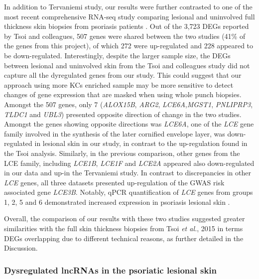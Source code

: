 In addition to Tervaniemi study, our results were further contrasted to one of the most recent comprehensive RNA-seq study comparing lesional and uninvolved full thickness skin biopsies from psoriasis patients \parencite{Tsoi2015}. Out of the 3,723 DEGs reported by Tsoi and colleagues, 507 genes were shared between the two studies (41\% of the genes from this project), of which 272 were up-regulated and 228 appeared to be down-regulated. Interestingly, despite the larger sample size, the DEGs between lesional and uninvolved skin from the Tsoi and colleagues study did not capture all the dyregulated genes from our study. This could suggest that our approach using more KCs enriched sample may be more sensitive to detect changes of gene expression that are masked when using whole punch biopsies. Amongst the 507 genes, only 7 (\textit{ALOX15B},  \textit{ARG2}, \textit{LCE6A},\textit{MGST1}, \textit{PNLIPRP3}, \textit{TLDC1} and \textit{UBL3}) presented opposite direction of change in the two studies. Amongst the genes showing opposite directions was \textit{LCE6A}, one of the \textit{LCE} gene family involved in the synthesis of the later cornified envelope layer, was down-regulated in lesional skin in our study, in contrast to the up-regulation found in the Tsoi analysis. Similarly, in the previous comparison, other genes from the LCE family, including \textit{LCE1B}, \textit{LCE1F} and \textit{LCE2A} appeared also down-regulated in our data and up-in the Tervaniemi study. In contrast to discrepancies in other \textit{LCE} genes, all three datasets presented up-regulation of the GWAS risk associated gene \textit{LCE3B}. Notably, qPCR quantification of \textit{LCE} genes from groups 1, 2, 5 and 6 demonstrated increased expression in psoriasis lesional skin \parencite{Bergboer2011}. 


Overall, the comparison of our results with these two studies suggested greater similarities with the full skin thickness biopsies from Tsoi \textit{et al.}, 2015 in terms DEGs overlapping due to different technical reasons, as further detailed in the Discussion. 


\subsubsection{Dysregulated lncRNAs in the psoriatic lesional skin}

